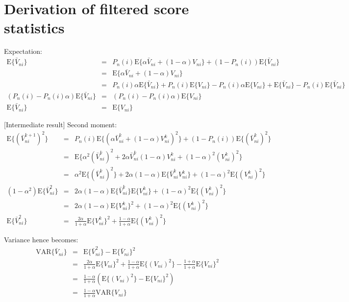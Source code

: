 
\appendix

\section{Derivation of filtered score statistics}
\label{sec:derive-filtered-score}


Expectation:
\begin{eqnarray*}
\text{E}\{\bar{V}_{ni}\} & = & P_{n}(i)\text{E}\{\alpha\bar{V}_{ni}+(1-\alpha)V_{ni}\}+(1-P_{n}(i))\text{E}\{\bar{V}_{ni}\}\\
 & = & \text{E}\{\alpha\bar{V}_{ni}+(1-\alpha)V_{ni}\}\\
 & = & P_{n}(i)\alpha\text{E}\{\bar{V}_{ni}\}+P_{n}(i)\text{E}\{V_{ni}\}-P_{n}(i)\alpha\text{E}\{V_{ni}\}+\text{E}\{\bar{V}_{ni}\}-P_{n}(i)\text{E}\{\bar{V}_{ni}\}\\
(P_{n}(i)-P_{n}(i)\alpha)\text{E}\{\bar{V}_{ni}\} & = & (P_{n}(i)-P_{n}(i)\alpha)\text{E}\{V_{ni}\}\\
\text{E}\{\bar{V}_{ni}\} & = & \text{E}\{V_{ni}\}
\end{eqnarray*}


{[}Intermediate result{]} Second moment:
\begin{eqnarray*}
\text{E}\{(\bar{V}_{ni}^{k+1})^{2}\} & = & P_{n}(i)\text{E}\{(\alpha\bar{V}_{ni}^{k}+(1-\alpha)V_{ni}^{k})^{2}\}+(1-P_{n}(i))\text{E}\{(\bar{V}_{ni}^{k})^{2}\}\\
 & = & \text{E}\{\alpha^{2}(\bar{V}_{ni}^{k})^{2}+2\alpha\bar{V}_{ni}^{k}(1-\alpha)V_{ni}^{k}+(1-\alpha)^{2}(V_{ni}^{k})^{2}\}\\
 & = & \alpha^{2}\text{E}\{(\bar{V}_{ni}^{k})^{2}\}+2\alpha(1-\alpha)\text{E}\{\bar{V}_{ni}^{k}V_{ni}^{k}\}+(1-\alpha)^{2}\text{E}\{(V_{ni}^{k})^{2}\}\\
(1-\alpha^{2})\text{E}\{\bar{V}_{ni}^{2}\} & = & 2\alpha(1-\alpha)\text{E}\{\bar{V}_{ni}^{k}\}\text{E}\{V_{ni}^{k}\}+(1-\alpha)^{2}\text{E}\{(V_{ni}^{k})^{2}\}\\
 & = & 2\alpha(1-\alpha)\text{E}\{V_{ni}^{k}\}^{2}+(1-\alpha)^{2}\text{E}\{(V_{ni}^{k})^{2}\}\\
\text{E}\{\bar{V}_{ni}^{2}\} & = & \frac{2\alpha}{1+\alpha}\text{E}\{V_{ni}^{k}\}^{2}+\frac{1-\alpha}{1+\alpha}\text{E}\{(V_{ni}^{k})^{2}\}
\end{eqnarray*}


Variance hence becomes:
\begin{eqnarray*}
\text{VAR}\{\bar{V}_{ni}\} & = & \text{E}\{\bar{V}_{ni}^{2}\}-\text{E}\{\bar{V}_{ni}\}^{2}\\
 & = & \frac{2\alpha}{1+\alpha}\text{E}\{V_{ni}\}^{2}+\frac{1-\alpha}{1+\alpha}\text{E}\{(V_{ni})^{2}\}-\frac{1+\alpha}{1+\alpha}\text{E}\{V_{ni}\}^{2}\\
 & = & \frac{1-\alpha}{1+\alpha}\left(\text{E}\{(V_{ni})^{2}\}-\text{E}\{V_{ni}\}^{2}\right)\\
 & = & \frac{1-\alpha}{1+\alpha}\text{VAR}\{V_{ni}\}
\end{eqnarray*}
